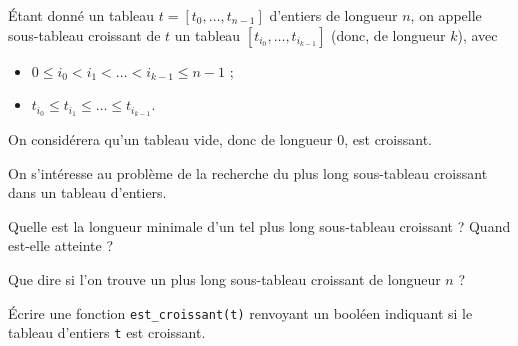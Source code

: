 \exer{}
\setcounter{numques}{0}

\'Etant donné un tableau $t = [t_0,\dots,t_{n-1}]$ d'entiers de longueur $n$, on appelle sous-tableau croissant de $t$ un tableau $[t_{i_0},\dots,t_{i_{k-1}}]$ (donc, de longueur $k$), avec 
\begin{itemize}
  \item $0\leq i_0 < i_1 < \dots < i_{k-1} \leq n-1$ ;
  \item $t_{i_0}\leq t_{i_1} \leq \dots \leq t_{i_{k-1}}$.
\end{itemize}
On considérera qu'un tableau vide, donc de longueur $0$, est croissant.

On s'intéresse au problème de la recherche du plus long sous-tableau croissant dans un tableau d'entiers. 

\question{} Quelle est la longueur minimale d'un tel plus long sous-tableau croissant ? Quand est-elle atteinte ?

\question{} Que dire si l'on trouve un plus long sous-tableau croissant de longueur $n$ ? 

\question{}  Écrire une fonction \texttt{est\_croissant(t)} renvoyant un booléen indiquant si le tableau d'entiers \texttt{t} est croissant. 


